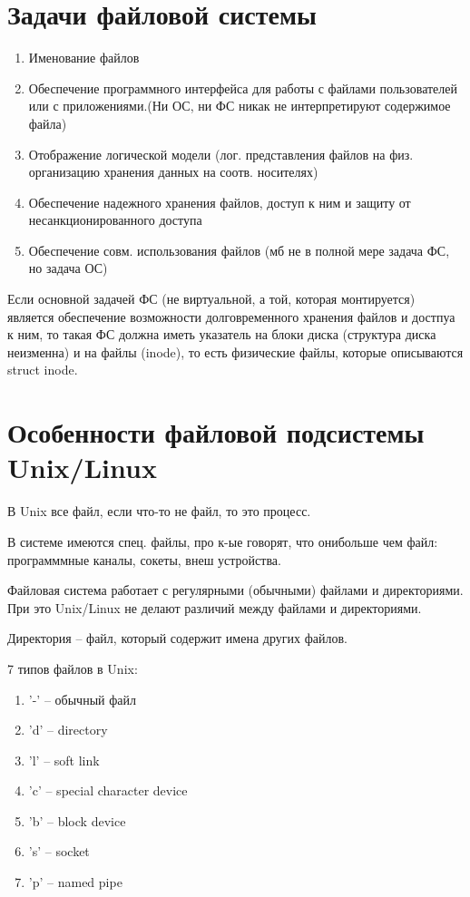 \section{Задачи файловой системы}
\begin{enumerate}
    \item Именование файлов
    \item Обеспечение программного интерфейса для работы с файлами пользователей или с приложениями.(Ни ОС, ни ФС никак не интерпретируют содержимое файла)
    \item Отображение логической модели (лог. представления файлов на физ. организацию хранения данных на соотв. носителях)
    \item Обеспечение надежного хранения файлов, доступ к ним и защиту от несанкционированного доступа
    \item Обеспечение совм. использования файлов (мб не в полной мере задача ФС, но задача ОС)
\end{enumerate}

Если основной задачей ФС (не виртуальной, а той, которая монтируется) является обеспечение возможности долговременного хранения файлов и достпуа к ним, то такая ФС должна иметь указатель на блоки диска (структура диска неизменна) и на файлы (inode), то есть физические файлы, которые описываются struct inode.

\section{Особенности файловой подсистемы Unix/Linux}
В Unix все файл, если что-то не файл, то это процесс.

В системе имеются спец. файлы, про к-ые говорят, что онибольше чем файл: программмные каналы, сокеты, внеш устройства.

Файловая система работает с регулярными (обычными) файлами и директориями. При это Unix/Linux не делают различий между файлами и директориями.

Директория -- файл, который содержит имена других файлов.

7 типов файлов в Unix:
\begin{enumerate}
    \item '-' -- обычный файл
    \item 'd' -- directory
    \item 'l' -- soft link
    \item 'c' -- special character device
    \item 'b' -- block device
    \item 's' -- socket
    \item 'p' -- named pipe
\end{enumerate}

